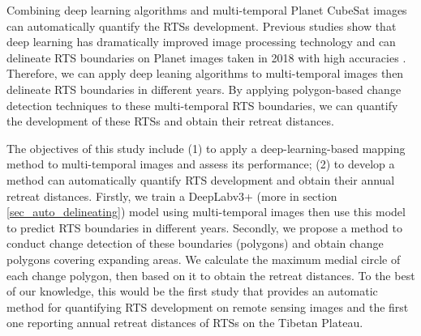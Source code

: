 \documentclass[authoryear,preprint,review,12pt]{elsarticle}
\begin{document}
Combining deep learning algorithms and multi-temporal Planet CubeSat images can automatically quantify the RTSs development.
Previous studies show that deep learning has dramatically improved image processing technology \citep{leCun2015Deep} and can delineate RTS boundaries on Planet images taken in 2018 with high accuracies \citep{huang2020using}. 
Therefore, we can apply deep leaning algorithms to multi-temporal images then delineate RTS boundaries in different years.
By applying polygon-based change detection techniques to these multi-temporal RTS boundaries, we can quantify the development of these RTSs and obtain their retreat distances. 


The objectives of this study include (1) to apply a deep-learning-based mapping method to multi-temporal images and assess its performance; (2) to develop a method can automatically quantify RTS development 
and obtain their annual retreat distances.
Firstly, we train a DeepLabv3+ (more in section \ref{sec_auto_delineating}) model using multi-temporal images then use this model to predict RTS boundaries in different years.
Secondly, we propose a method to conduct change detection of these boundaries (polygons)  and obtain change polygons covering expanding areas.  
We calculate the maximum medial circle of each change polygon, then based on it to obtain the retreat distances.  
To the best of our knowledge, this would be the first study that provides an automatic method for quantifying RTS development on remote sensing images and the first one reporting annual retreat distances of RTSs on the Tibetan Plateau. 

\end{document}
